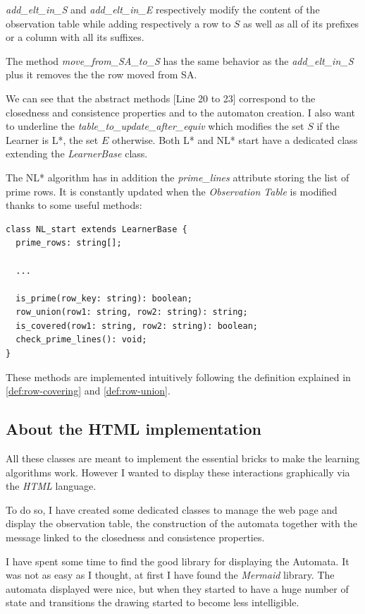 \textit{add\_elt\_in\_S} and \textit{add\_elt\_in\_E} respectively modify the content of the observation table while adding respectively a row to $S$ as well as all of its prefixes or a column with all its suffixes.

The method \textit{move\_from\_SA\_to\_S} has the same behavior as the \textit{add\_elt\_in\_S} plus it removes the the row moved from SA.

We can see that the abstract methods [Line 20 to 23] correspond to the closedness and consistence properties and to the automaton creation. I also want to underline the \textit{table\_to\_update\_after\_equiv} which modifies the set $S$ if the Learner is L*, the set $E$ otherwise. Both L* and NL* start have a dedicated class extending the \textit{LearnerBase} class.

The NL* algorithm has in addition the \textit{prime\_lines} attribute storing the list of prime rows. It is constantly updated when the \textit{Observation Table} is modified thanks to some useful methods:

\begin{lstlisting}
class NL_start extends LearnerBase {
  prime_rows: string[];

  ... 

  is_prime(row_key: string): boolean;
  row_union(row1: string, row2: string): string;
  is_covered(row1: string, row2: string): boolean;
  check_prime_lines(): void;
}
\end{lstlisting}

These methods are implemented intuitively following the definition explained in \cref{def:row-covering} and \cref{def:row-union}.

\subsection{About the HTML implementation}

All these classes are meant to implement the essential bricks to make the learning algorithms work. However I wanted to display these interactions graphically via the \textit{HTML} language.

To do so, I have created some dedicated classes to manage the web page and display the observation table, the construction of the automata together with the message linked to the closedness and consistence properties.

I have spent some time to find the good library for displaying the Automata. It was not as easy as I thought, at first I have found the \textit{Mermaid} library. The automata displayed were nice, but when they started to have a huge number of state and transitions the drawing started to become less intelligible.

